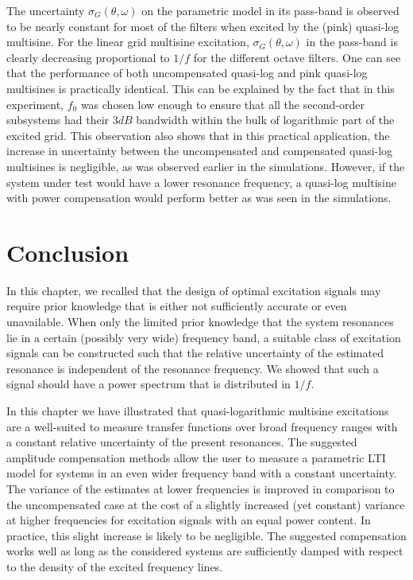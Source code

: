     The uncertainty $\sigma_G\left(\theta,\omega\right)$ on the parametric model in its pass-band is observed to be nearly constant for most of the filters when excited by the (pink) quasi-log multisine.
    For the linear grid multisine excitation, $\sigma_G\left(\theta,\omega\right)$ in the pass-band is clearly decreasing proportional to $1 / f$ for the different octave filters.
    One can see that the performance of both uncompensated quasi-log and pink quasi-log multisines is practically identical.
    This can be explained by the fact that in this experiment, $f_0$ was chosen low enough to ensure that all the second-order subsystems had their $3\unit{dB}$ bandwidth within the bulk of logarithmic part of the excited grid.
    This observation also shows that in this practical application, the increase in uncertainty between the uncompensated and compensated quasi-log multisines is negligible, as was observed earlier in the simulations.
    However, if the system under test would have a lower resonance frequency, a quasi-log multisine with power compensation would perform better as was seen in the simulations.

\section{Conclusion}
\label{sec:excitation:conclusion}
In this chapter, we recalled that the design of optimal excitation signals may require prior knowledge that is either not sufficiently accurate or even unavailable.
When only the limited prior knowledge that the system resonances lie in a certain (possibly very wide) frequency band, a suitable class of excitation signals can be constructed such that the relative uncertainty of the estimated resonance is independent of the resonance frequency.
We showed that such a signal should have a power spectrum that is distributed in $1/f$.

In this chapter we have illustrated that quasi-logarithmic multisine excitations are a well-suited to measure transfer functions over broad frequency ranges with a constant relative uncertainty of the present resonances.
The suggested amplitude compensation methods allow the user to measure a parametric \gls{LTI} model for systems in an even wider frequency band with a constant uncertainty.
The variance of the estimates at lower frequencies is improved in comparison to the uncompensated case at the cost of a slightly increased (yet constant) variance at higher frequencies for excitation signals with an equal power content.
In practice, this slight increase is likely to be negligible.
The suggested compensation works well as long as the considered systems are sufficiently damped with respect to the density of the excited frequency lines.

